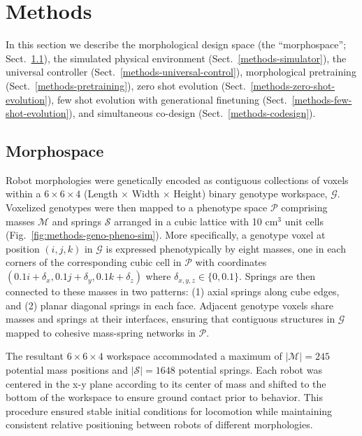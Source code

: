 \section{Methods}
\label{sec:methods} 

In this section we describe 
the morphological design space (the ``morphospace''; Sect.~\ref{methods-morphology-design-space}),
the simulated physical environment (Sect.~\ref{methods-simulator}),
the universal controller (Sect.~\ref{methods-universal-control}),
morphological pretraining (Sect.~\ref{methods-pretraining}),
zero shot evolution (Sect.~\ref{methods-zero-shot-evolution}),
few shot evolution with generational finetuning (Sect.~\ref{methods-few-shot-evolution}),
and 
simultaneous co-design (Sect.~\ref{methods-codesign}).


\subsection{Morphospace}
\label{methods-morphology-design-space}

Robot morphologies were genetically encoded as contiguous collections of voxels 
within a $6 \times 6 \times 4$ (Length $\times$ Width $\times$ Height) binary genotype workspace, $\mathcal{G}$. 
Voxelized genotypes were then mapped to a phenotype space $\mathcal{P}$ comprising 
masses $\mathcal{M}$ and springs $\mathcal{S}$ 
arranged in a cubic lattice 
with 10 cm$^3$ unit cells 
(Fig.~\ref{fig:methods-geno-pheno-sim}).
% 
More specifically, a genotype voxel at position $(i,j,k)$ in $\mathcal{G}$ is expressed phenotypically by eight masses,
one in each corners of the corresponding cubic cell in $\mathcal{P}$ with coordinates $(0.1i+\delta_x,0.1j+\delta_y,0.1k+\delta_z)$ where $\delta_{x,y,z} \in \{0,0.1\}$. 
Springs are then connected to these masses in two patterns: (1) axial springs along cube edges, and (2) planar diagonal springs in each face. 
Adjacent genotype voxels share masses and springs at their interfaces, 
ensuring that contiguous structures in $\mathcal{G}$ mapped to cohesive mass-spring networks in $\mathcal{P}$.

The resultant $6 \times 6 \times 4$ workspace accommodated a maximum of $|\mathcal{M}|=245$ potential mass positions and $|\mathcal{S}|=1648$ potential springs. 
Each robot was centered in the x-y plane according to its center of mass and shifted to the bottom of the workspace to ensure ground contact prior to behavior. 
This procedure ensured stable initial conditions for locomotion while maintaining consistent relative positioning between robots of different morphologies.

